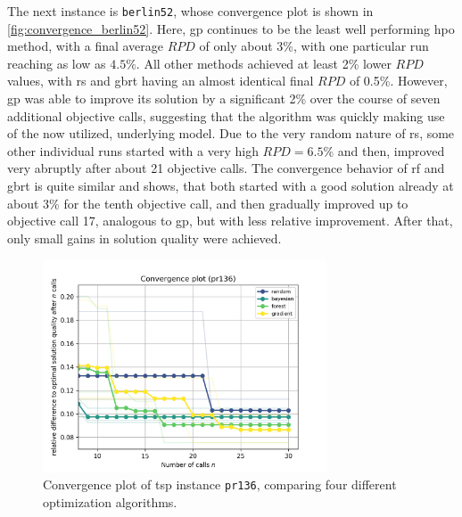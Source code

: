 The next instance is \texttt{berlin52}, whose convergence plot is shown in \cref{fig:convergence_berlin52}. Here, \gls{gp} continues to be the least well performing \gls{hpo} method, with a final average $RPD$ of only about 3\%, with one particular run reaching as low as $4.5\%$. All other methods achieved at least 2\% lower $RPD$ values, with \gls{rs} and \gls{gbrt} having an almost identical final $RPD$ of 0.5\%. 
However, \gls{gp} was able to improve its solution by a significant 2\% over the course of seven additional objective calls, suggesting that the algorithm was quickly making use of the now utilized, underlying model.
Due to the very random nature of \gls{rs}, some other individual runs started with a very high $RPD = 6.5\%$ and then, improved very abruptly after about 21 objective calls. The convergence behavior of \gls{rf} and \gls{gbrt} is quite similar and shows, that both started with a good solution already at about 3\% for the tenth objective call, and then gradually improved up to objective call 17, analogous to \gls{gp}, but with less relative improvement. After that, only small gains in solution quality were achieved.

\begin{figure}[h]
	\centering
	\includegraphics[width=0.75\textwidth]{results/part1/convergence_pr136.png}
	\caption[Convergence plot of \gls{tsp} instance \texttt{pr136}]{Convergence plot of \gls{tsp} instance \texttt{pr136}, comparing four different optimization algorithms.}
	\label{fig:convergence_pr136}
\end{figure}

